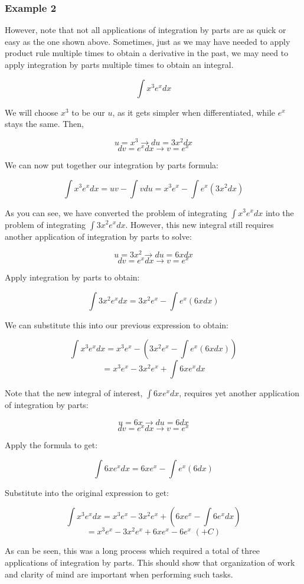 \documentclass[11pt]{article}
\begin{document}
\subsubsection*{Example 2}
However, note that not all applications of integration by parts are as quick or easy as the one shown above. Sometimes, just as we may have needed to apply product rule multiple times to obtain a derivative in the past, we may need to apply integration by parts multiple times to obtain an integral.

\[ \int x^3 e^x dx \]

We will choose $x^3$ to be our $u$, as it gets simpler when differentiated, while $e^x$ stays the same. Then, 

\[ u = x^3 \to du = 3x^2 dx \]
\[ dv = e^x dx \to v = e^x \]

We can now put together our integration by parts formula:

\[ \int x^3 e^x dx = uv - \int v du = x^3e^x - \int e^x (3x^2 dx)\]

As you can see, we have converted the problem of integrating $\int x^3 e^x dx$ into the problem of integrating $\int 3x^2e^x dx$. However, this new integral still requires another application of integration by parts to solve:

\[ u = 3x^2 \to du = 6x dx \]
\[ dv = e^x dx \to v = e^x \]

Apply integration by parts to obtain:

\[ \int 3x^2e^x dx = 3x^2e^x - \int e^x(6x dx)\]

We can substitute this into our previous expression to obtain:

\[ \int x^3 e^x dx = x^3e^x - (3x^2e^x - \int e^x(6x dx))\]
\[ = x^3e^x - 3x^2e^x + \int 6xe^x dx\]

Note that the new integral of interest, $\int 6xe^x dx$, requires yet another application of integration by parts:

\[ u = 6x \to du = 6 dx\]
\[ dv = e^x dx \to v = e^x\]

Apply the formula to get:

\[ \int 6xe^xdx = 6xe^x - \int e^x(6 dx)\]

Substitute into the original expression to get:

\[ \int x^3 e^x dx = x^3e^x - 3x^2e^x + (6xe^x - \int 6e^x dx)\]
\[ = x^3e^x - 3x^2e^x + 6xe^x - 6e^x \,\,(+C)\]

As can be seen, this was a long process which required a total of three applications of integration by parts. This should show that organization of work and clarity of mind are important when performing such tasks.
\end{document}
